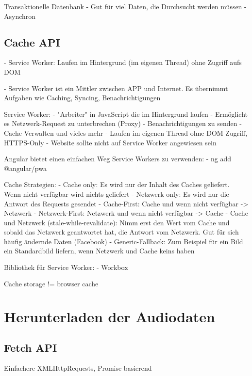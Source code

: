 Transaktionelle Datenbank
- Gut für viel Daten, die Durchsucht werden müssen
- Asynchron

\subsection{Cache API}

- Service Worker: Laufen im Hintergrund (im eigenen Thread) ohne Zugriff aufs DOM \autocite{Sheppard2017}

- Service Worker ist ein Mittler zwischen APP und Internet. Es übernimmt Aufgaben wie Caching, Syncing, Benachrichtigungen \autocite{Sheppard2017}

Service Worker:
- "Arbeiter" in JavaScript die im Hintergrund laufen
- Ermöglicht es Netzwerk-Request zu unterbrechen (Proxy)
- Benachrichtigungen zu senden
- Cache Verwalten und vieles mehr
- Laufen im eigenen Thread ohne DOM Zugriff, HTTPS-Only
- Website sollte nicht auf Service Worker angewiesen sein
\autocite{Hajian2019}

Angular bietet einen einfachen Weg Service Workers zu verwenden:
- ng add @angular/pwa
\autocite{Hajian2019}

Cache Strategien:
- Cache only: Es wird nur der Inhalt des Caches geliefert. Wenn nicht verfügbar wird nichts geliefert
- Netzwerk only: Es wird nur die Antwort des Requests gesendet
- Cache-First: Cache und wenn nicht verfügbar -> Netzwerk
- Netzwerk-First: Netzwerk und wenn nicht verfügbar -> Cache
- Cache und Netzwerk (stale-while-revalidate): Nimm erst den Wert vom Cache und sobald das Netzwerk geantwortet hat, die Antwort vom Netzwerk. Gut für sich häufig ändernde Daten (Facebook)
- Generic-Fallback: Zum Beispiel für ein Bild ein Standardbild liefern, wenn Netzwerk und Cache keins haben
\autocite{Hajian2019} \autocite{Rojas2020}

Bibliothek für Service Worker:
- Workbox
\autocite{Rojas2020}

Cache storage != browser cache \autocite{Rojas2020}

\section{Herunterladen der Audiodaten}

\subsection{Fetch API}

Einfachere XMLHttpRequests, Promise basierend
\autocite{Rojas2020}

